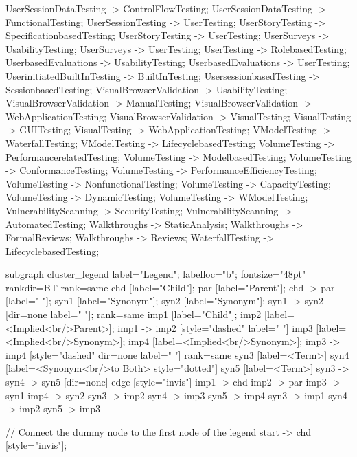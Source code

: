 \documentclass{article}
\begin{document}
{UserSessionDataTesting -> ControlFlowTesting;
UserSessionDataTesting -> FunctionalTesting;
UserSessionTesting -> UserTesting;
UserStoryTesting -> SpecificationbasedTesting;
UserStoryTesting -> UserTesting;
UserSurveys -> UsabilityTesting;
UserSurveys -> UserTesting;
UserTesting -> RolebasedTesting;
UserbasedEvaluations -> UsabilityTesting;
UserbasedEvaluations -> UserTesting;
UserinitiatedBuiltInTesting -> BuiltInTesting;
UsersessionbasedTesting -> SessionbasedTesting;
VisualBrowserValidation -> UsabilityTesting;
VisualBrowserValidation -> ManualTesting;
VisualBrowserValidation -> WebApplicationTesting;
VisualBrowserValidation -> VisualTesting;
VisualTesting -> GUITesting;
VisualTesting -> WebApplicationTesting;
VModelTesting -> WaterfallTesting;
VModelTesting -> LifecyclebasedTesting;
VolumeTesting -> PerformancerelatedTesting;
VolumeTesting -> ModelbasedTesting;
VolumeTesting -> ConformanceTesting;
VolumeTesting -> PerformanceEfficiencyTesting;
VolumeTesting -> NonfunctionalTesting;
VolumeTesting -> CapacityTesting;
VolumeTesting -> DynamicTesting;
VolumeTesting -> WModelTesting;
VulnerabilityScanning -> SecurityTesting;
VulnerabilityScanning -> AutomatedTesting;
Walkthroughs -> StaticAnalysis;
Walkthroughs -> FormalReviews;
Walkthroughs -> Reviews;
WaterfallTesting -> LifecyclebasedTesting;

subgraph cluster_legend {
    label="Legend";
    labelloc="b";
    fontsize="48pt"
    rankdir=BT
    {
        rank=same
        chd [label="Child"];
        par [label="Parent"];
        chd -> par [label="                "];
        syn1 [label="Synonym"];
        syn2 [label="Synonym"];
        syn1 -> syn2 [dir=none label="                "];
    }
    {
        rank=same
        imp1 [label="Child"];
        imp2 [label=<Implied<br/>Parent>];
        imp1 -> imp2 [style="dashed" label="                "]
        imp3 [label=<Implied<br/>Synonym>];
        imp4 [label=<Implied<br/>Synonym>];
        imp3 -> imp4 [style="dashed" dir=none label="                "]
    }
    {
        rank=same
        syn3 [label=<Term>]
        syn4 [label=<Synonym<br/>to Both> style="dotted"]
        syn5 [label=<Term>]
        syn3 -> syn4 -> syn5 [dir=none]
    }
    edge [style="invis"]
    imp1 -> chd
    imp2 -> par
    imp3 -> syn1
    imp4 -> syn2
syn3 -> imp2
syn4 -> imp3
syn5 -> imp4
syn3 -> imp1
syn4 -> imp2
syn5 -> imp3
}

// Connect the dummy node to the first node of the legend
start -> chd [style="invis"];
}
\end{document}
